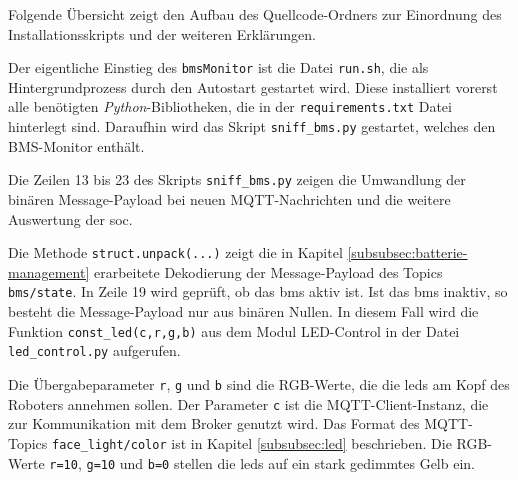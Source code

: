 

\noindent Folgende Übersicht zeigt den Aufbau des Quellcode-Ordners zur Einordnung des Installationsskripts und der weiteren Erklärungen.

\vspace*{5pt}

Der eigentliche Einstieg des \texttt{bmsMonitor} ist die Datei \texttt{run.sh}, die als Hintergrundprozess durch den
Autostart gestartet wird.
Diese installiert vorerst alle benötigten \emph{Python}-Bibliotheken, die in der \texttt{requirements.txt} Datei hinterlegt
sind.
Daraufhin wird das Skript \texttt{sniff\_bms.py} gestartet, welches den BMS-Monitor enthält.



\noindent Die Zeilen \num{13} bis \num{23} des Skripts \texttt{sniff\_bms.py} zeigen die Umwandlung der binären Message-Payload
bei neuen MQTT-Nachrichten und die weitere Auswertung der \gls{soc}.



\noindent Die Methode \texttt{struct.unpack(...)} zeigt die in Kapitel \ref{subsubsec:batterie-management} erarbeitete
Dekodierung der Message-Payload des Topics \texttt{bms/state}.
In Zeile \num{19} wird geprüft, ob das \gls{bms} aktiv ist.
Ist das \gls{bms} inaktiv, so besteht die Message-Payload nur aus binären Nullen.
In diesem Fall wird die Funktion \texttt{const\_led(c,r,g,b)} aus dem Modul LED-Control in der Datei \texttt{led\_control.py}
aufgerufen.



\noindent Die Übergabeparameter \texttt{r}, \texttt{g} und \texttt{b} sind die RGB-Werte, die die \glspl{led} am Kopf des
Roboters annehmen sollen.
Der Parameter \texttt{c} ist die MQTT-Client-Instanz, die zur Kommunikation mit dem Broker genutzt wird.
Das Format des MQTT-Topics \texttt{face\_light/color} ist in Kapitel \ref{subsubsec:led} beschrieben.
Die RGB-Werte \texttt{r=10}, \texttt{g=10} und \texttt{b=0} stellen die \glspl{led} auf ein stark gedimmtes Gelb ein.

